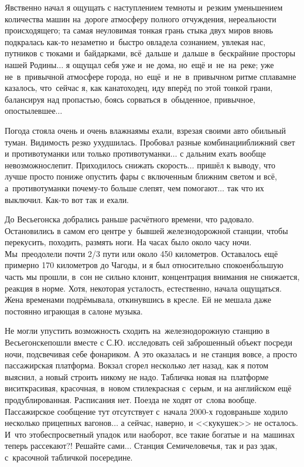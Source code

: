Явственно начал я ощущать с наступлением темноты и~резким уменьшением количества машин на~дороге атмосферу полного отчуждения, нереальности происходящего; та самая неуловимая тонкая грань стыка двух миров вновь подкралась как-то незаметно и~быстро овладела сознанием, увлекая нас, путников с тюками и~байдарками, всё~дальше и~дальше в~бескрайние просторы нашей Родины$\ldots$ я ощущал себя уже и~не дома, но~ещё и~не~на~реке; уже не~в~привычной атмосфере города, но~ещё~и~не~в~привычном ритме сплава\mdash мне казалось, что~сейчас я, как канатоходец, иду вперёд по этой тонкой грани, балансируя над пропастью, боясь сорваться в~обыденное, привычное, опостылевшее$\ldots$

Погода стояла очень и очень влажная\mdash мы ехали, взрезая своими авто обильный туман. Видимость резко ухудшилась. Пробовал разные комбинации\mdash ближний свет и противотуманки или только противотуманки$\ldots$ с дальним ехать вообще невозможно\mdash слепит. Приходилось снижать скорость$\ldots$ пришёл к выводу, что лучше просто пониже опустить фары с включенным ближним светом и всё, а~противотуманки почему-то больше слепят, чем помогают$\ldots$ так что их выключил. Как-то вот так и ехали. 

До Весьегонска добрались раньше расчётного времени, что радовало. Остановились в самом его центре у~бывшей железнодорожной станции, чтобы перекусить, походить, размять ноги. На часах было около часу ночи. Мы~преодолели почти 2/3 пути или около 450 километров. Оставалось ещё примерно 170 километров до Чагоды, и я был относительно спокоен\mdash б\'{о}льшую часть мы прошли, в~сон не сильно клонит, концентрация внимания не снижается, реакция в норме. Хотя, некоторая усталость, естественно, начала ощущаться. Жена временами подрёмывала, откинувшись в кресле. Ей не мешала даже постоянно играющая в салоне музыка. 

Не могли упустить возможность сходить на~железнодорожную станцию в Весьегонске\mdash пошли вместе с С.Ю. исследовать сей заброшенный объект посреди ночи, подсвечивая себе фонариком. А это оказалась и~не станция вовсе, а просто пассажирская платформа. Вокзал сгорел несколько лет назад, как я потом выяснил, а новый строить никому не надо. Табличка новая на~платформе висит\mdash красивая, красочная, в~новом стиле\mdash красная с~серым, и на английском ещё продублированная. Расписания нет. Поезда не ходят от~слова вообще. Пассажирское сообщение тут отсутствует с~начала 2000-х годов\mdash раньше ходило несколько прицепных вагонов$\ldots$ а сейчас, наверно, и <<кукушек>> не осталось. И~что это\mdash беспросветный упадок или наоборот, все такие богатые и~на~машинах теперь рассекают?! Решайте сами$\ldots$ Станция Семичеловечья\cite{ГеографГлобусПропил}, так и раз эдак, с~красочной табличкой посередине.

